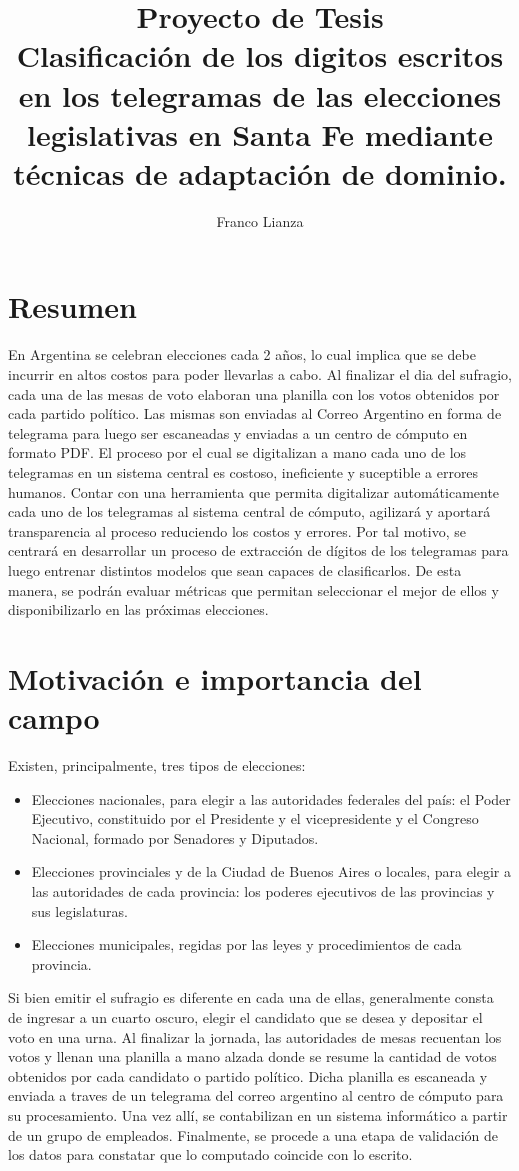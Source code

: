 \documentclass[a4paper, twoside, spanish]{report}
\title{Proyecto de Tesis\\ \large Clasificaci\'on de los digitos escritos en los telegramas de las elecciones legislativas en Santa Fe mediante
t\'ecnicas de adaptaci\'on de dominio.}
\author{Franco Lianza}
\begin{document}

\newpage

\section*{Resumen}

En Argentina se celebran elecciones cada 2 a\~{n}os, lo cual implica que se debe incurrir en altos costos para poder
llevarlas a cabo. Al finalizar el dia del sufragio, cada una de las mesas de voto elaboran una planilla con los votos
obtenidos por cada partido pol\'itico. Las mismas son enviadas al Correo Argentino en forma de telegrama para luego ser
escaneadas y enviadas a un centro de c\'omputo en formato PDF. El proceso por el cual se digitalizan a mano cada uno de
los telegramas en un sistema central es costoso, ineficiente y suceptible a errores humanos. Contar con una herramienta
que permita digitalizar autom\'aticamente cada uno de los telegramas al sistema central de c\'omputo, agilizar\'a y
aportar\'a transparencia al proceso reduciendo los costos y errores. Por tal motivo, se centrar\'a en desarrollar un
proceso de extracci\'on de d\'igitos de los telegramas para luego entrenar distintos modelos que sean capaces de
clasificarlos. De esta manera, se podr\'an evaluar m\'etricas que permitan seleccionar el mejor de ellos y
disponibilizarlo en las pr\'oximas elecciones.

\section*{Motivación e importancia del campo}

Existen, principalmente, tres tipos de elecciones:

\begin{itemize}
	\item Elecciones nacionales, para elegir a las autoridades federales del país: el Poder Ejecutivo, constituido por el
	      Presidente y el vicepresidente y el Congreso Nacional, formado por Senadores y Diputados.
	\item Elecciones provinciales y de la Ciudad de Buenos Aires o locales, para elegir a las autoridades de cada provincia: los
	      poderes ejecutivos de las provincias y sus legislaturas.
	\item Elecciones municipales, regidas por las leyes y procedimientos de cada provincia.
\end{itemize}

Si bien emitir el sufragio es diferente en cada una de ellas, generalmente consta de ingresar a un cuarto oscuro,
elegir el candidato que se desea y depositar el voto en una urna. Al finalizar la jornada, las autoridades de mesas
recuentan los votos y llenan una planilla a mano alzada donde se resume la cantidad de votos obtenidos por cada
candidato o partido pol\'itico. Dicha planilla es escaneada y enviada a traves de un telegrama del correo argentino al
centro de c\'omputo para su procesamiento. Una vez all\'i, se contabilizan en un sistema inform\'atico a partir de un
grupo de empleados. Finalmente, se procede a una etapa de validaci\'on de los datos para constatar que lo computado
coincide con lo escrito.
\end{document}
